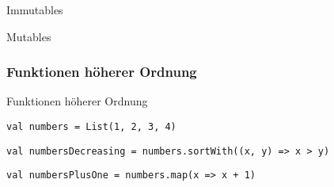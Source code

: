 \documentclass[14pt,aspectratio=169,trans]{beamer} %
\begin{document}
\begin{frame}[plain]
\begin{block}{Immutables}
   \begin{centering} 
     \par
   \end{centering}
	\end{block}
\end{frame} 


\begin{frame}[plain]
\begin{block}{Mutables}
   \begin{centering} 
     \par
   \end{centering}
	\end{block}
	\note{
	}
\end{frame} 


\subsubsection*{Funktionen höherer Ordnung}

\begin{frame}[fragile]{}
 \begin{block}{Funktionen höherer Ordnung}
\scriptsize
	\onslide<2->
  \begin{lstlisting}
val numbers = List(1, 2, 3, 4)

	\end{lstlisting}
  \begin{lstlisting}[firstnumber = 2]
val numbersDecreasing = numbers.sortWith((x, y) => x > y)	
\end{lstlisting}
  \begin{lstlisting}[firstnumber = 3]
val numbersPlusOne = numbers.map(x => x + 1)
\end{lstlisting}
\end{block}
\end{frame}
\end{document}
